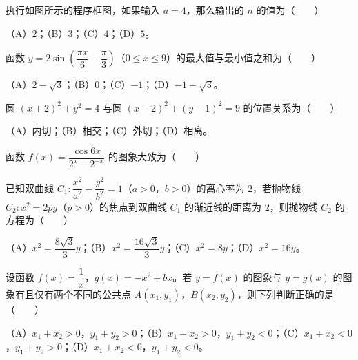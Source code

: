 \begin{question}
执行如图所示的程序框图，如果输入 $a=4$，那么输出的 $n$ 的值为\mbox{（　　）}
\nopagebreak[4]
\begin{center}\end{center}
\nopagebreak[4]
（A）$2$；（B）$3$；（C）$4$；（D）$5$。

\end{question}
\begin{question}
函数 $y=2\sin\left(\dfrac{\pi x}6-\dfrac\pi3\right)$（$0\leqslant x\leqslant9$）的最大值与最小值之和为\mbox{（　　）}

（A）$2-\sqrt3$；（B）$0$；（C）$-1$；（D）$-1-\sqrt3$。

\end{question}
\begin{question}
圆 $(x+2)^2+y^2=4$ 与圆 $(x-2)^2+(y-1)^2=9$ 的位置关系为\mbox{（　　）}

（A）内切；（B）相交；（C）外切；（D）相离。

\Needspace{0.4\textheight}
\end{question}
\begin{question}
函数 $f(x)=\dfrac{\cos6x}{2^x-2^{-x}}$ 的图象大致为\mbox{（　　）}
\nopagebreak[4]
\begin{center}\end{center}
\nopagebreak[4]
\end{question}
\begin{question}
已知双曲线 $C_1:\dfrac{x^2}{a^2}-\dfrac{y^2}{b^2}=1$（$a>0$，$b>0$）的离心率为 $2$，若抛物线 $C_2:x^2=2py$（$p>0$）的焦点到双曲线 $C_1$ 的渐近线的距离为 $2$，则抛物线 $C_2$ 的方程为\mbox{（　　）}

（A）$x^2=\dfrac{8\sqrt3}3y$；（B）$x^2=\dfrac{16\sqrt3}3y$；（C）$x^2=8y$；（D）$x^2=16y$。

\end{question}
\begin{question}
设函数 $f(x)=\dfrac1x$，$g(x)=-x^2+bx$。若 $y=f(x)$ 的图象与 $y=g(x)$ 的图象有且仅有两个不同的公共点 $A(x_1,y_1)$，$B(x_2,y_2)$，则下列判断正确的是\mbox{（　　）}

（A）$x_1+x_2>0$，$y_1+y_2>0$；（B）$x_1+x_2>0$，$y_1+y_2<0$；（C）$x_1+x_2<0$，$y_1+y_2>0$；（D）$x_1+x_2<0$，$y_1+y_2<0$。

\end{question}


